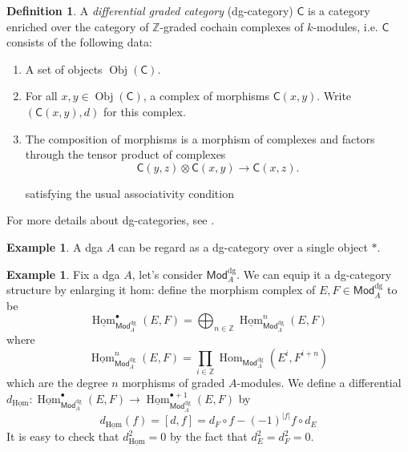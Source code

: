 \documentclass[12pt]{amsart}
\theoremstyle{definition}
\newtheorem{example}[thm]{Example}
\newtheorem{defn}[thm]{Definition}
\theoremstyle{remark}
\numberwithin{equation}{section}
\newcommand{\CC}{{\mathsf C}}
\newcommand{\Z}{{\mathbb{Z}}}
\newcommand{\1}{{\mathbb{1}}}
\newcommand{\ob}{\operatorname{Obj}}
\newcommand{\Mod}{\mathsf{Mod}}
\newcommand{\bt}{\bullet}
\newcommand{\dg}{{\operatorname{dg}}}
\newcommand{\Hom}{\operatorname{Hom}}
\newcommand{\HOM}{\underline{\operatorname{Hom}}}
\begin{document}
    
    \begin{defn}
           A {\it differential graded category} (dg-category) $\CC$ is a category enriched over the category of $\Z$-graded cochain complexes of $k$-modules, i.e. $\CC$ consists of the following data:
        \begin{enumerate}
            \item A set of objects $\ob(\CC)$.
            \item For all $x, y \in \ob(\CC)$, a complex of morphisms $\CC(x,y)$. Write $(\CC(x,y),d)$ for this complex.
            \item The composition of morphisms is a morphism of complexes and factors through the tensor product of complexes
            \begin{equation*}
             \CC(y, z)\otimes \CC(x, y)\to \CC(x, z).
            \end{equation*}

satisfying the usual associativity condition
            
        \end{enumerate}
    \end{defn}
    For more details about dg-categories, see \cite{Kel06}. 
    \begin{example}
        A dga $A$ can be regard as a dg-category over a single object $*$.
    \end{example}
    \begin{example}
        Fix a dga $A$, let's consider $\Mod^{\dg}_{A}$. We can equip it a dg-category structure by enlarging it hom: define the morphism complex of $E, F \in \Mod^{\dg}_{A}$ to be 
        \begin{equation*}
            \HOM_{\Mod^{\dg}_{A}}^{\bt}({E,F}) = \bigoplus_{n\in \Z} \HOM_{\Mod^{\dg}_{A}}^{n}({E,F})
        \end{equation*}
        where 
        \begin{equation*}
            \HOM_{\Mod^{\dg}_{A}}^{n}({E,F}) = \prod_{i\in \Z} \Hom_{\Mod^{\dg}_{A}}(E^i,F^{i+n})
        \end{equation*}
        which are the degree $n$ morphisms of graded $A$-modules. We define a differential $d_{\HOM}:\HOM_{\Mod^{\dg}_{A}}^{\bt}({E,F})\to \HOM_{\Mod^{\dg}_{A}}^{\bt+1}({E,F})$ by
        \begin{equation*}
            d_{\HOM}(f) = [d,f] = d_F \circ f - (-1)^{|f|}f \circ d_E
        \end{equation*}
        It is easy to check that $d_{\HOM}^2 = 0$ by the fact that $d_E^2 = d_F^2 = 0$.
    \end{example}
\end{document}
